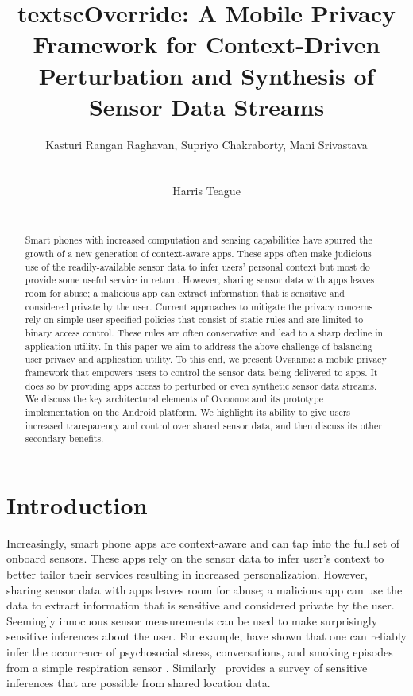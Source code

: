 \documentclass[10pt]{sensys-proc}
\author{

\alignauthor Kasturi Rangan Raghavan, Supriyo Chakraborty, Mani Srivastava\\
	\affaddr{University of California, Los Angeles}\\
	\email{\{kasturir,supriyo,mani\}@ucla.edu}

\alignauthor Harris Teague\\
	\affaddr{Qualcomm Inc.}\\
	\email{hteague@qualcomm.com}
}
\title{textsc{Override}: A Mobile Privacy Framework for Context-Driven
Perturbation and Synthesis of Sensor Data Streams}
\begin{document}
\maketitle

\begin{abstract}
Smart phones with increased computation and sensing capabilities have spurred the growth of a new generation of context-aware apps. These apps often make judicious use of the readily-available sensor data to infer users' personal context but most do provide some useful service in return. However, sharing sensor data with apps leaves room for abuse; a malicious app can extract information that is sensitive and considered private by the user. Current approaches to mitigate the privacy concerns rely on simple user-specified policies that consist of static rules and are limited to binary access control. These rules are often conservative and lead to a sharp decline in application utility. In this paper we aim to  address the above challenge of balancing user privacy and application utility. To this end, we present \textsc{Override}: a mobile privacy framework that empowers users to control the sensor data being delivered to apps. It does so by providing apps access to perturbed or even synthetic sensor data streams. We discuss the key architectural elements of \textsc{Override} and its prototype implementation on the Android platform. We highlight its ability to give users increased transparency and control over shared sensor data, and then discuss its other secondary benefits.
\end{abstract}

\section{Introduction}
\label{sec:intro}
Increasingly, smart phone apps are context-aware and can tap into the full set of onboard sensors. These apps rely on the sensor data to infer user's context to better tailor their services resulting in increased personalization. However, sharing sensor data with apps leaves room for abuse; a malicious app can use the data to extract information that is sensitive and considered private by the user. Seemingly innocuous sensor measurements can be used to make surprisingly sensitive inferences about the user. For example, \cite{plarre:psychological, rahman:mConverse} have shown that one can reliably infer the occurrence of psychosocial stress, conversations, and smoking episodes from a simple respiration sensor
\cite{Ertin:AutoSense}. Similarly~\cite{krumm:survey} provides a survey of sensitive inferences that are possible from shared location data.
\end{document}
